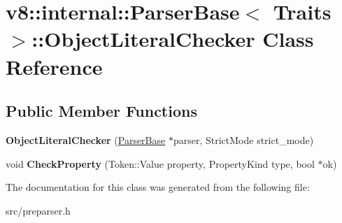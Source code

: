 \hypertarget{classv8_1_1internal_1_1_parser_base_1_1_object_literal_checker}{}\section{v8\+:\+:internal\+:\+:Parser\+Base$<$ Traits $>$\+:\+:Object\+Literal\+Checker Class Reference}
\label{classv8_1_1internal_1_1_parser_base_1_1_object_literal_checker}
\subsection*{Public Member Functions}
\begin{DoxyCompactItemize}
\item 
\hypertarget{classv8_1_1internal_1_1_parser_base_1_1_object_literal_checker_a0b6cbab51b06b7ed7837dba87c40935c}{}{\bfseries Object\+Literal\+Checker} (\hyperlink{classv8_1_1internal_1_1_parser_base}{Parser\+Base} $\ast$parser, Strict\+Mode strict\+\_\+mode)\label{classv8_1_1internal_1_1_parser_base_1_1_object_literal_checker_a0b6cbab51b06b7ed7837dba87c40935c}

\item 
\hypertarget{classv8_1_1internal_1_1_parser_base_1_1_object_literal_checker_a4e6bfdb9c75d366d8c595ffc3062ad43}{}void {\bfseries Check\+Property} (Token\+::\+Value property, Property\+Kind type, bool $\ast$ok)\label{classv8_1_1internal_1_1_parser_base_1_1_object_literal_checker_a4e6bfdb9c75d366d8c595ffc3062ad43}

\end{DoxyCompactItemize}


The documentation for this class was generated from the following file\+:\begin{DoxyCompactItemize}
\item 
src/preparser.\+h\end{DoxyCompactItemize}
